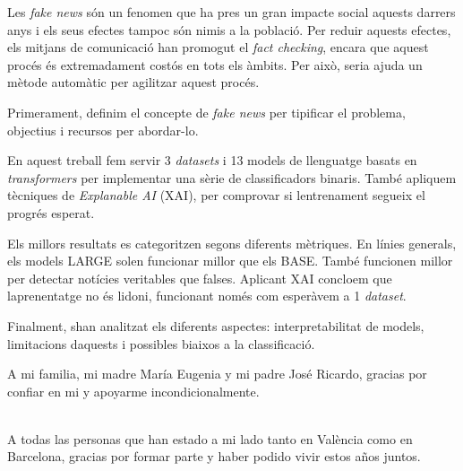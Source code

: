 \documentclass[twoside,spanish,a4paper,12pt]{tfg}
\begin{document}
\begin{resum}
	Les \textit{fake news} són un fenomen que ha pres un gran impacte social aquests darrers anys i els seus efectes tampoc són nimis a la població. Per reduir aquests efectes, els mitjans de comunicació han promogut el \textit{fact checking}, encara que aquest procés és extremadament costós en tots els àmbits. Per això, seria ajuda un mètode automàtic per agilitzar aquest procés.

	Primerament, definim el concepte de \textit{fake news} per tipificar el problema, objectius i recursos per abordar-lo.

	En aquest treball fem servir 3 \textit{datasets} i 13 models de llenguatge basats en \textit{transformers} per implementar una sèrie de classificadors binaris. També apliquem tècniques de \textit{Explanable AI} (XAI), per comprovar si l\textquotesingle entrenament segueix el progrés esperat.

	Els millors resultats es categoritzen segons diferents mètriques. En línies generals, els models LARGE solen funcionar millor que els BASE. També funcionen millor per detectar notícies veritables que falses. Aplicant XAI concloem que l\textquotesingle aprenentatge no és l\textquotesingle idoni, funcionant només com esperàvem a 1 \textit{dataset}.

	Finalment, s\textquotesingle han analitzat els diferents aspectes: interpretabilitat de models, limitacions d\textquotesingle aquests i possibles biaixos a la classificació.
\end{resum}
\cleardoublepage


\begin{agradecimientos}
	A mi familia, mi madre María Eugenia y mi padre José Ricardo, gracias por confiar en mi y apoyarme incondicionalmente.

	\\

	A todas las personas que han estado a mi lado tanto en València como en Barcelona, gracias por formar parte y haber podido vivir estos años juntos.
\end{agradecimientos}
\cleardoublepage

\tableofcontents

\pagestyle{tfg}
\justify


\end{document}
